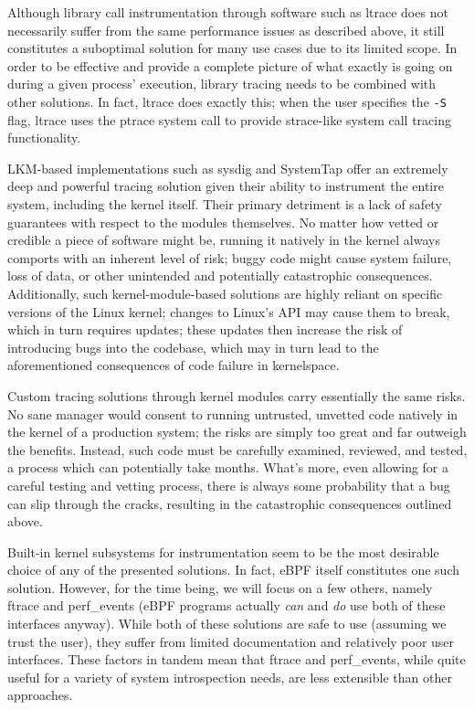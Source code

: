 \documentclass[
  12pt]{findlay}
\begin{document}
Although library call instrumentation through software such as ltrace
\autocite{rubirabranco07,manltrace} does not necessarily suffer from the
same performance issues as described above, it still constitutes a
suboptimal solution for many use cases due to its limited scope. In
order to be effective and provide a complete picture of what exactly is
going on during a given process' execution, library tracing needs to be
combined with other solutions. In fact, ltrace does exactly this; when
the user specifies the \texttt{-S} flag, ltrace uses the ptrace system
call to provide strace-like system call tracing functionality.

LKM-based implementations such as sysdig \autocite{sysdig} and SystemTap
\autocite{systemtap} offer an extremely deep and powerful tracing
solution given their ability to instrument the entire system, including
the kernel itself. Their primary detriment is a lack of safety
guarantees with respect to the modules themselves. No matter how vetted
or credible a piece of software might be, running it natively in the
kernel always comports with an inherent level of risk; buggy code might
cause system failure, loss of data, or other unintended and potentially
catastrophic consequences. Additionally, such kernel-module-based
solutions are highly reliant on specific versions of the Linux kernel;
changes to Linux's API may cause them to break, which in turn requires
updates; these updates then increase the risk of introducing bugs into
the codebase, which may in turn lead to the aforementioned consequences
of code failure in kernelspace.

Custom tracing solutions through kernel modules carry essentially the
same risks. No sane manager would consent to running untrusted, unvetted
code natively in the kernel of a production system; the risks are simply
too great and far outweigh the benefits. Instead, such code must be
carefully examined, reviewed, and tested, a process which can
potentially take months. What's more, even allowing for a careful
testing and vetting process, there is always some probability that a bug
can slip through the cracks, resulting in the catastrophic consequences
outlined above.

Built-in kernel subsystems for instrumentation seem to be the most
desirable choice of any of the presented solutions. In fact, eBPF
\autocite{starovoitov13,starovoitov14} itself constitutes one such
solution. However, for the time being, we will focus on a few others,
namely ftrace \autocite{ftrace} and perf\_events
\autocite{manperfeventopen} (eBPF programs actually \emph{can} and
\emph{do} use both of these interfaces anyway). While both of these
solutions are safe to use (assuming we trust the user), they suffer from
limited documentation and relatively poor user interfaces. These factors
in tandem mean that ftrace and perf\_events, while quite useful for a
variety of system introspection needs, are less extensible than other
approaches.
\end{document}
